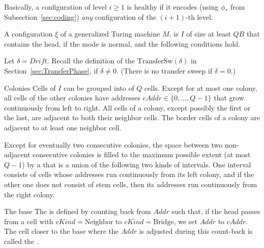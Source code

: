 \documentclass[12pt]{memoir}
\newcommand{\fld}[1]{\ensuremath{\textit{#1}}}
\def\B{B}
\newcommand{\Addr}{\fld{Addr}}
\newcommand{\cAddr}{\fld{cAddr}}
\newcommand{\Drift}{\fld{Drift}}
\newcommand{\cKind}{\fld{cKind}}
\newcommand{\Bridge}{\mathrm{Bridge}}
\newcommand{\Neighbor}{\mathrm{Neighbor}}
\newcommand{\TransferSw}{\mathrm{TransferSw}}
\begin{document}
Basically, a configuration of level \( i \geq 1 \) is healthy if it encodes (using \( \phi_* \)
from Subsection~\ref{sec:coding}) \emph{any} configuration of the \( (i+1) \)-th level.

\begin{definition}
\label{def:healthy1}
    A configuration \( \xi \) of a generalized Turing machine \( M \),
    is  \( I \) of size at least \( Q\B \)
    that contains the head, if the mode is normal, and the following conditions hold.

    Let \( \delta = \Drift \).
    Recall the definition of the 
    \( \TransferSw(\delta) \) in Section~\ref{sec:TransferPhase}, if \( \delta \ne 0 \).
    (There is no transfer sweep if \( \delta = 0 \).)

\begin{flushdescription}

\item[Colonies]
        Cells of \( I \) can be grouped into  of \( Q \) cells.
        Except for at most one colony, all cells of the other colonies
        have addresses \( \cAddr \in \{0, \dots, Q-1\} \) 
        that grow continuously from left to right.
        All cells of a colony, except possibly the first or the last, are adjacent to both their
        neighbor cells.
        The border cells of a colony are adjacent to at least one neighbor cell.

        Except for eventually two consecutive colonies,
        the space between two non-adjacent
        consecutive colonies
        is filled to the maximum possible extent
         (at most \( Q-1 \)) by a  that
         is a union of the following two kinds of intervals.
         One interval consists of cells whose addresses run continuously from its left
         colony, and if the other one does not consist of stem cells, then its addresses 
         run continuously from the right colony.

       \item[The base]
        The  is defined by counting back from \( \Addr \)
        such that, if the head
        passes from a cell with
        \( \cKind = \Neighbor \)
        to
        \( \cKind = \Bridge \),
        we set \( \Addr \) to \( \cAddr \).
        The cell closer to the base
        where the \( \Addr \) is adjusted during
        this count-back is called the
        .


\end{flushdescription}
\end{definition}
\end{document}
